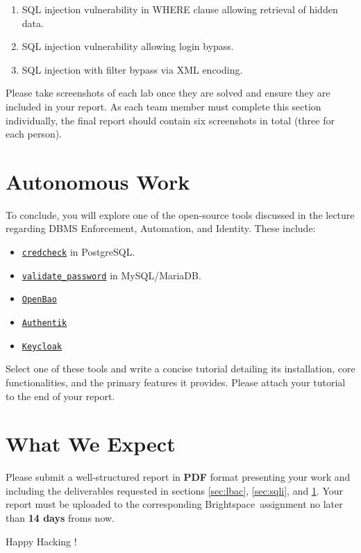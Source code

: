 \documentclass{article}
\begin{document}
\begin{enumerate}
    \item SQL injection vulnerability in WHERE clause allowing retrieval of hidden data.
    \item SQL injection vulnerability allowing login bypass.
    \item SQL injection with filter bypass via XML encoding.
\end{enumerate}

Please take screenshots of each lab once they are solved and ensure they are included in your report. As each team member must complete this section individually, the final report should contain six screenshots in total (three for each person).

\section{Autonomous Work} \label{sec:work}
To conclude, you will explore one of the open-source tools discussed in the lecture regarding DBMS Enforcement, Automation, and Identity. These include:

\begin{itemize}
    \item \texttt{\href{https://github.com/HexaCluster/credcheck}{credcheck}} in PostgreSQL.
    \item \texttt{\href{https://dev.mysql.com/doc/refman/8.4/en/validate-password-options-variables.html}{validate\_password}} in MySQL/MariaDB.
    \item \texttt{\href{https://openbao.org/}{OpenBao}}
    \item \texttt{\href{https://goauthentik.io/}{Authentik}}
    \item \texttt{\href{https://www.keycloak.org/}{Keycloak}}
\end{itemize}

Select one of these tools and write a concise tutorial detailing its installation, core functionalities, and the primary features it provides. Please attach your tutorial to the end of your report.

\section{What We Expect}
Please submit a well-structured report in \textbf{PDF} format presenting your work and including the deliverables requested in sections \ref{sec:lbac}, \ref{sec:sqli}, and \ref{sec:work}. Your report must be uploaded to the corresponding Brightspace\texttrademark ~assignment no later than \textbf{14 days} froms now. %

\vspace{5mm}
Happy Hacking !
\end{document}
